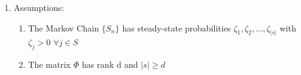 \documentclass[11pt]{article}
\begin{document}
\begin{enumerate}
\begin{align*}
\hat{v}_w = \Phi w = \begin{bmatrix} \phi_1(1) \\ \phi_1(2) \\ \vdots \\ \phi_1(|s|) \\ \end{bmatrix} w_1
                   + \begin{bmatrix} \phi_2(1) \\ \phi_2(2) \\ \vdots \\ \phi_2(|s|) \\ \end{bmatrix} w_2
                   + ...
                   + \begin{bmatrix} \phi_d(1) \\ \phi_d(2) \\ \vdots \\ \phi_d(|s|) \\ \end{bmatrix} w_d
\end{align*}

Let \(\phi_i = \begin{bmatrix} \phi_i(1) \\ \phi_i(2) \\ \vdots \\ \phi_i(|s|) \end{bmatrix}\) : ith feature vector or ith basis vector

Let \(S_0 = \{ \Phi w | w \in \mathbb{R}^d \}\) denote hte space of linear function approximations parameterized by \(w \in \mathbb{R}^d}\)

\item Assumptions:
\label{sec:orgdb548bd}
\begin{enumerate}
\item The Markov Chain \(\{ S_n \}\) has steady-state probabilities \(\zeta_1, \zeta_2, ..., \zeta_{|s|}\) with \(\zeta_j > 0\) \(\forall j \in S\)
\item The matrix \(\Phi\) has rank d and \(|s| \geq d\)
\end{enumerate}


\end{enumerate}
\end{document}
